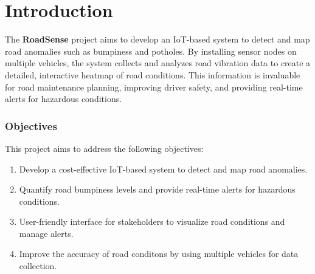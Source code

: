 \section{Introduction}

The \textbf{RoadSense} project aims to develop an IoT-based system to detect and map road anomalies such as bumpiness and potholes. 
By installing sensor nodes on multiple vehicles, the system collects and analyzes road vibration data to create a detailed, interactive heatmap of road conditions. 
This information is invaluable for road maintenance planning, improving driver safety, and providing real-time alerts for hazardous conditions.

\subsubsection{Objectives}

This project aims to address the following objectives:

\begin{enumerate}
    \item Develop a cost-effective IoT-based system to detect and map road anomalies.
    \item Quantify road bumpiness levels and provide real-time alerts for hazardous conditions.
    \item User-friendly interface for stakeholders to visualize road conditions and manage alerts.
    \item Improve the accuracy of road conditons by using multiple vehicles for data collection.
\end{enumerate}
